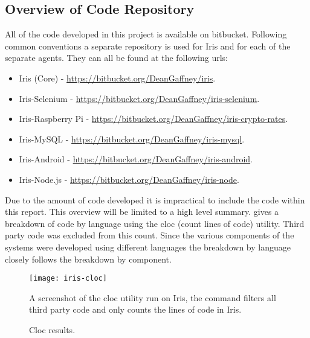 \documentclass[12pt,a4paper,titlepage]{report}
\begin{document}
\begin{appendices}


\chapter{Overview of Code Repository}
All of the code developed in this project is available on bitbucket. Following common conventions a separate repository is used for Iris and for each of the separate agents. They can all be found at the following urls:
\begin{itemize}
    \item Iris (Core) - \url{https://bitbucket.org/DeanGaffney/iris}.
    \item Iris-Selenium - \url{https://bitbucket.org/DeanGaffney/iris-selenium}.
    \item Iris-Raspberry Pi - \url{https://bitbucket.org/DeanGaffney/iris-crypto-rates}.
    \item Iris-MySQL - \url{https://bitbucket.org/DeanGaffney/iris-mysql}.
    \item Iris-Android - \url{https://bitbucket.org/DeanGaffney/iris-android}.
    \item Iris-Node.js - \url{https://bitbucket.org/DeanGaffney/iris-node}.
\end{itemize}

Due to the amount of code developed it is impractical to include the code within this report. This overview will be limited to a high level summary.  gives a breakdown of code by language using the cloc (count lines of code) utility. Third party code was excluded from this count. Since the various components of the systems were developed using different languages the breakdown by language closely follows the breakdown by component.

\begin{figure}[H]
\begin{tcolorbox}
\begin{center}
\texttt{[image: iris-cloc]}
\end{center}
A screenshot of the cloc utility run on Iris, the command filters all third party code and only counts the lines of code in Iris.
\end{tcolorbox}
\caption{Cloc results.}
\label{fig:cloc}
\end{figure}


\end{appendices}
\end{document}
